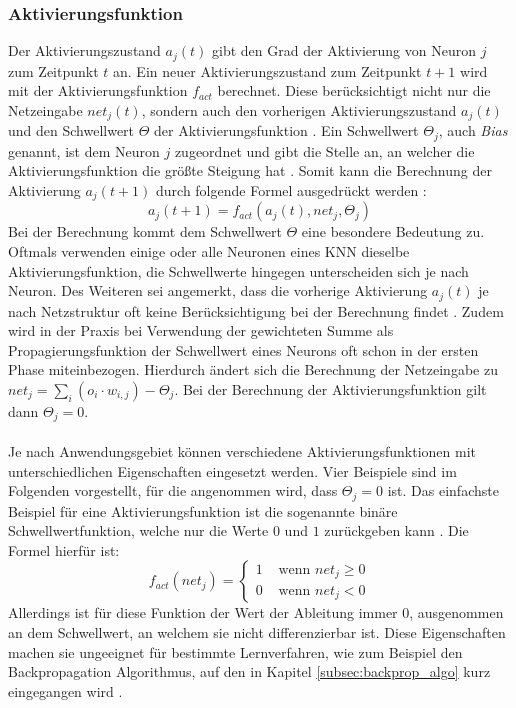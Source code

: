 \subsubsection{Aktivierungsfunktion}
\label{subsubsec:activatoin_function}
Der Aktivierungszustand $a_j(t)$ gibt den Grad der Aktivierung von Neuron $j$ zum Zeitpunkt $t$ an. Ein neuer Aktivierungszustand zum Zeitpunkt $t+1$ wird mit der Aktivierungsfunktion $f_{act}$ berechnet. Diese berücksichtigt nicht nur die Netzeingabe $net_j(t)$, sondern auch den vorherigen Aktivierungszustand $a_j(t)$ und den Schwellwert $\Theta$ der Aktivierungsfunktion \cite{zell2003simulation}. Ein Schwellwert $\Theta_j$, auch \emph{Bias} genannt, ist dem Neuron $j$ zugeordnet und gibt die Stelle an, an welcher die Aktivierungsfunktion die größte Steigung hat \cite{kriesel2008kleiner}. Somit kann die Berechnung der Aktivierung $a_j(t+1)$ durch folgende Formel ausgedrückt werden \cite{zell2003simulation}:
$$a_j(t+1)=f_{act}(a_j(t), net_j, \Theta_j)$$
Bei der Berechnung kommt dem Schwellwert $\Theta$ eine besondere Bedeutung zu. Oftmals verwenden einige oder alle Neuronen eines \ac{KNN} dieselbe Aktivierungsfunktion, die Schwellwerte hingegen unterscheiden sich je nach Neuron. Des Weiteren sei angemerkt, dass die vorherige Aktivierung $a_j(t)$ je nach Netzstruktur oft keine Berücksichtigung bei der Berechnung findet \cite{kriesel2008kleiner}. Zudem wird in der Praxis bei Verwendung der gewichteten Summe als Propagierungsfunktion der Schwellwert eines Neurons oft schon in der ersten Phase miteinbezogen. Hierdurch ändert sich die Berechnung der Netzeingabe zu $net_j=\sum_{i}(o_{i} \cdot w_{i, j}) - \Theta_j$. Bei der Berechnung der Aktivierungsfunktion gilt dann $\Theta_j = 0$.
\\\\
Je nach Anwendungsgebiet können verschiedene Aktivierungsfunktionen mit unterschiedlichen Eigenschaften eingesetzt werden. Vier Beispiele sind im Folgenden vorgestellt, für die angenommen wird, dass $\Theta_j=0$ ist. Das einfachste Beispiel für eine Aktivierungsfunktion ist die sogenannte binäre Schwellwertfunktion, welche nur die Werte $0$ und $1$ zurückgeben kann \cite{kriesel2008kleiner}. Die Formel hierfür ist: 
$$
f_{act}(net_j)=\left\{\begin{array}{ll}
1 & \text { wenn } net_j \geq 0 \\
0 & \text { wenn } net_j < 0
\end{array}\right.
$$
Allerdings ist für diese Funktion der Wert der Ableitung immer $0$, ausgenommen an dem Schwellwert, an welchem sie nicht differenzierbar ist. Diese Eigenschaften machen sie ungeeignet für bestimmte Lernverfahren, wie zum Beispiel den Backpropagation Algorithmus, auf den in Kapitel \ref{subsec:backprop_algo} kurz eingegangen wird \cite{kriesel2008kleiner}. \\\\
